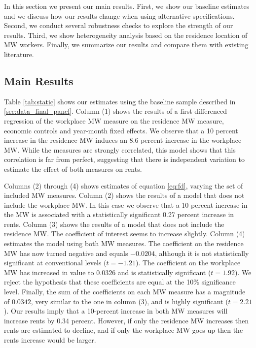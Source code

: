 
In this section we present our main results.
First, we show our baseline estimates and we discuss how our results change
when using alternative specifications.
Second, we conduct several robustness checks to explore the strength of 
our results.
Third, we show heterogeneity analysis based on the residence location of MW 
workers.
Finally, we summarize our results and compare them with existing literature.

\subsection{Main Results}\label{sec:main_results}

Table \ref{tab:static} shows our estimates using the baseline sample
described in \ref{sec:data_final_panel}.
Column (1) shows the results of a first-differenced regression of the workplace
MW measure on the residence MW measure, economic controls and year-month fixed
effects.
We observe that a 10 percent increase in the residence MW induces an 
8.6 percent increase in the workplace MW.
While the measures are strongly correlated, this model shows that this 
correlation is far from perfect, suggesting that there is independent variation
to estimate the effect of both measures on rents.

Columns (2) through (4) shows estimates of equation \eqref{eq:fd}, varying the
set of included MW measures.
Column (2) shows the results of a model that does not include the workplace MW.
In this case we observe that a 10 percent increase in the MW is associated with
a statistically significant 0.27 percent increase in rents.
Column (3) shows the results of a model that does not include the residence MW.
The coefficient of interest seems to increase slightly.
Column (4) estimates the model using both MW measures.
The coefficient on the residence MW has now turned negative and equals $-0.0204$, 
although it is not statistically significant at conventional levels ($t=-1.21$).
The coefficient on the workplace MW has increased in value to $0.0326$ and is 
statistically significant ($t=1.92$).
We reject the hypothesis that these coefficients are equal at the 10\% 
significance level.
Finally, the sum of the coefficients on each MW measure has a magnitude of 
$0.0342$, very similar to the one in column (3), and is highly significant 
($t=2.21$).
Our results imply that a 10-percent increase in both MW measures will increase
rents by $0.34$ percent.
However, if only the residence MW increases then rents are estimated to decline,
and if only the workplace MW goes up then the rents increase would be larger.

